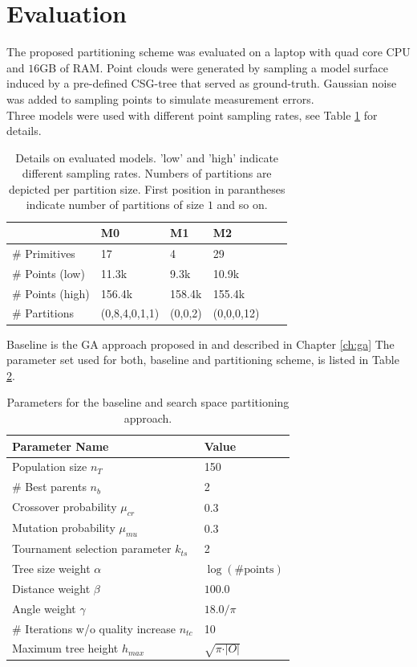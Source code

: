 \section{Evaluation}
\label{ch:eval}
The proposed partitioning scheme was evaluated on a laptop with quad core CPU and $16$GB of RAM.
Point clouds were generated by sampling a model surface induced by a pre-defined \ac{CSG}-tree that served as ground-truth. Gaussian noise was added to sampling points to simulate measurement errors.
\\
Three models were used with different point sampling rates, see Table \ref{tab::models} for details. 
\begin{table}[h]
	\centering
	\begin{tabular}{|l|l|l|l|l|l|}
	\hline
	 & \textbf{M0} & \textbf{M1} & \textbf{M2} \\
	\hline
	\# Primitives & 17 & 4 & 29 \\
	\hline
	\# Points (low) & 11.3k & 9.3k & 10.9k\\
	\hline
	\# Points (high) & 156.4k & 158.4k & 155.4k\\
	\hline
	\# Partitions & (0,8,4,0,1,1) & (0,0,2) &  (0,0,0,12)\\
	\hline	
	\end{tabular}
	\caption{Details on evaluated models. 'low' and 'high' indicate different sampling rates. Numbers of partitions are depicted per partition size. First position in parantheses indicate number of partitions of size $1$ and so on.}
	\label{tab::models}
\end{table}
Baseline is the \ac{GA} approach proposed in \cite{fayolle2016evolutionary} and described in Chapter \ref{ch:ga} The parameter set used for both, baseline and partitioning scheme, is listed in Table \ref{tab:gaparams}.
\begin{table}[h]
	\centering
	\begin{tabular}{|l|l|}
		\hline
		\textbf{Parameter Name} & \textbf{Value}  \\
		\hline
		Population size $n_T$ & 150 \\
		\hline
		\# Best parents $n_b$ & 2 \\
		\hline
		Crossover probability $\mu_{cr}$& 0.3 \\
		\hline
		Mutation probability $\mu_{mu}$& 0.3 \\
		\hline
		Tournament selection parameter $k_{ts}$ & 2\\
		\hline
		Tree size weight $\alpha$& $\log(\text{\#points})$\\
		\hline
		Distance weight $\beta$& $100.0$ \\
		\hline
		Angle weight $\gamma$& $18.0/\pi$ \\
		\hline 
		\# Iterations w/o quality increase $n_{tc}$ & 10 \\
		\hline 
		Maximum tree height $h_{max}$ & $\sqrt{\pi\cdot \vert O \vert}$ \\
		\hline 
	\end{tabular}
	\caption{Parameters for the baseline and search space partitioning approach.}
	\label{tab:gaparams}
\end{table}
